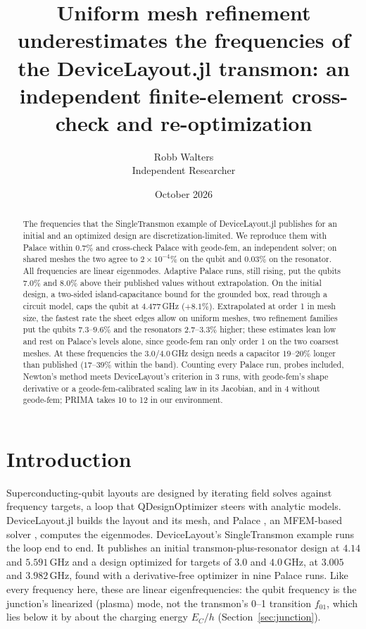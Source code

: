 \documentclass{anvil-paper}
\title{Uniform mesh refinement underestimates the frequencies of the
DeviceLayout.jl transmon: an independent finite-element cross-check and
re-optimization}
\author{Robb Walters\\
  {\normalsize Independent Researcher}}
\date{October 2026}
\begin{document}
\maketitle

\begin{abstract}
The frequencies that the SingleTransmon example of DeviceLayout.jl
publishes for an initial and an optimized design are
discretization-limited. We reproduce them with Palace within $0.7\%$ and
cross-check Palace with geode-fem, an independent solver;
on shared meshes the two agree to $2\times10^{-4}\%$ on the qubit and
$0.03\%$ on the resonator. All frequencies are linear eigenmodes. Adaptive
Palace runs, still rising, put the qubits $7.0\%$ and $8.0\%$ above their
published values without extrapolation. On the initial design, a two-sided
island-capacitance bound for the grounded box, read through
a circuit model, caps the qubit at $4.477$\,GHz ($+8.1\%$). Extrapolated at order 1 in
mesh size, the fastest rate the sheet edges allow on uniform
meshes, two refinement families put the qubits $7.3$--$9.6\%$ and the
resonators $2.7$--$3.3\%$ higher; these estimates
lean low and rest on Palace's levels alone, since geode-fem ran only order
1 on the two coarsest meshes. At these frequencies the $3.0$/$4.0$\,GHz design
needs a capacitor $19$--$20\%$ longer than published ($17$--$39\%$ within
the band). Counting every Palace run, probes included, Newton's method meets DeviceLayout's
criterion in 3 runs, with geode-fem's shape derivative or a
geode-fem-calibrated scaling law in its Jacobian, and in 4 without
geode-fem; PRIMA takes 10 to 12 in our environment.
\end{abstract}

\section{Introduction}
\label{sec:intro}

Superconducting-qubit layouts are designed by iterating field solves
against frequency targets, a loop that QDesignOptimizer
\citep{eriksson2025automated} steers with analytic models. DeviceLayout.jl \citep{devicelayout} builds the layout and
its mesh, and Palace \citep{palace}, an MFEM-based solver \citep{mfem},
computes the eigenmodes. DeviceLayout's SingleTransmon example
\citep{devicelayout-blog,devicelayout-example} runs the loop end to end. It
publishes an initial transmon-plus-resonator design at $4.14$ and
$5.591$\,GHz and a design optimized for targets of $3.0$ and $4.0$\,GHz, at
$3.005$ and $3.982$\,GHz, found with a derivative-free optimizer in nine
Palace runs. Like every frequency here, these are linear eigenfrequencies: the qubit
frequency is the junction's linearized (plasma) mode, not the transmon's
0--1 transition $f_{01}$, which lies below it by about the charging energy
$E_C/h$ (Section~\ref{sec:junction}).
\end{document}

